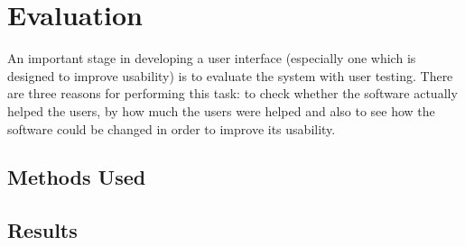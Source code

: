 \chapter{Evaluation}

An important stage in developing a user interface (especially one which is
designed to improve usability) is to evaluate the system with user testing.
There are three reasons for performing this task: to check whether the software
actually helped the users, by how much the users were helped and also to see
how the software could be changed in order to improve its usability.

\section{Methods Used}

\section{Results}
